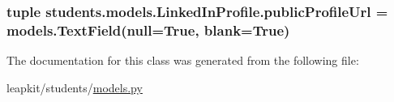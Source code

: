 \hypertarget{classstudents_1_1models_1_1_linked_in_profile_a4ca4e96f931603cea56405a4c6ca2c31}{
\subsubsection[{public\-Profile\-Url}]{\setlength{\rightskip}{0pt plus 5cm}tuple students.\-models.\-Linked\-In\-Profile.\-public\-Profile\-Url = models.\-Text\-Field(null=True, blank=True)\hspace{0.3cm}{\ttfamily [static]}}}\label{classstudents_1_1models_1_1_linked_in_profile_a4ca4e96f931603cea56405a4c6ca2c31}


The documentation for this class was generated from the following file\-:\begin{DoxyCompactItemize}
\item 
leapkit/students/\hyperlink{models_8py}{models.\-py}\end{DoxyCompactItemize}
